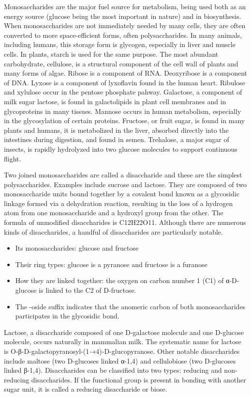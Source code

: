 Monosaccharides are the major fuel source for metabolism, being used both as an energy source (glucose being the most important in nature) and in biosynthesis. When monosaccharides are not immediately needed by many cells, they are often converted to more space-efficient forms, often polysaccharides. In many animals, including humans, this storage form is glycogen, especially in liver and muscle cells. In plants, starch is used for the same purpose. The most abundant carbohydrate, cellulose, is a structural component of the cell wall of plants and many forms of algae. Ribose is a component of RNA. Deoxyribose is a component of DNA. Lyxose is a component of lyxoflavin found in the human heart. Ribulose and xylulose occur in the pentose phosphate pahway. Galactose, a component of milk sugar lactose, is found in galactolipids in plant cell membranes and in glycoproteins in many tissues. Mannose occurs in human metabolism, especially in the glycosylation of certain proteins. Fructose, or fruit sugar, is found in many plants and humans, it is metabolized in the liver, absorbed directly into the intestines during digestion, and found in semen. Trehalose, a major sugar of insects, is rapidly hydrolyzed into two glucose molecules to support continuous flight.

Two joined monosaccharides are called a disaccharide and these are the simplest polysaccharides. Examples include sucrose and lactose. They are composed of two monosaccharide units bound together by a covalent bond known as a glycosidic linkage formed via a dehydration reaction, resulting in the loss of a hydrogen atom from one monosaccharide and a hydroxyl group from the other. The formula of unmodified disaccharides is C12H22O11. Although there are numerous kinds of disaccharides, a handful of disaccharides are particularly notable.

\begin{itemize}
\tightlist
\item
  Its monosaccharides: glucose and fructose
\item
  Their ring types: glucose is a pyranose and fructose is a furanose
\item
  How they are linked together: the oxygen on carbon number 1 (C1) of α-D-glucose is linked to the C2 of D-fructose.
\item
  The -oside suffix indicates that the anomeric carbon of both monosaccharides participates in the glycosidic bond.
\end{itemize}

Lactose, a disaccharide composed of one D-galactose molecule and one D-glucose molecule, occurs naturally in mammalian milk. The systematic name for lactose is O-β-D-galactopyranosyl-(1→4)-D-glucopyranose. Other notable disaccharides include maltose (two D-glucoses linked α-1,4) and cellulobiose (two D-glucoses linked β-1,4). Disaccharides can be classified into two types: reducing and non-reducing disaccharides. If the functional group is present in bonding with another sugar unit, it is called a reducing disaccharide or biose.



